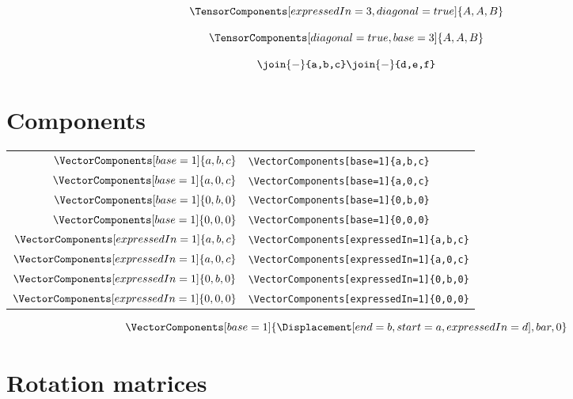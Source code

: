 \documentclass[10pt,a4paper]{article}
\begin{document}
\begin{equation}
\TensorComponents[expressedIn=3,diagonal=true]{A,A,B}
\end{equation}

\begin{equation}
\TensorComponents[diagonal=true,base=3]{A,A,B}
\end{equation}

\begin{equation}
\renewcommand*{\do}[1]{
    {
      \join{-}{#1}
    } \\
}
\docsvlist{{a,b,c},{d,e,f}}
\end{equation}

\section{Components}
\begin{tabular}{r|l}
$\VectorComponents[base=1]{a,b,c}$ & \verb+\VectorComponents[base=1]{a,b,c}+ \\
$\VectorComponents[base=1]{a,0,c}$ & \verb+\VectorComponents[base=1]{a,0,c}+ \\
$\VectorComponents[base=1]{0,b,0}$ & \verb+\VectorComponents[base=1]{0,b,0}+ \\
$\VectorComponents[base=1]{0,0,0}$ & \verb+\VectorComponents[base=1]{0,0,0}+ \\
$\VectorComponents[expressedIn=1]{a,b,c}$ & \verb+\VectorComponents[expressedIn=1]{a,b,c}+ \\
$\VectorComponents[expressedIn=1]{a,0,c}$ & \verb+\VectorComponents[expressedIn=1]{a,0,c}+ \\
$\VectorComponents[expressedIn=1]{0,b,0}$ & \verb+\VectorComponents[expressedIn=1]{0,b,0}+ \\
$\VectorComponents[expressedIn=1]{0,0,0}$ & \verb+\VectorComponents[expressedIn=1]{0,0,0}+ \\
\end{tabular}

\begin{equation}
 \def\foobarbaz{\Displacement[end=b,start=a,expressedIn=d]}
 \VectorComponents[base=1]{\foobarbaz,bar,0}
\end{equation}

\section{Rotation matrices}
\end{document}
